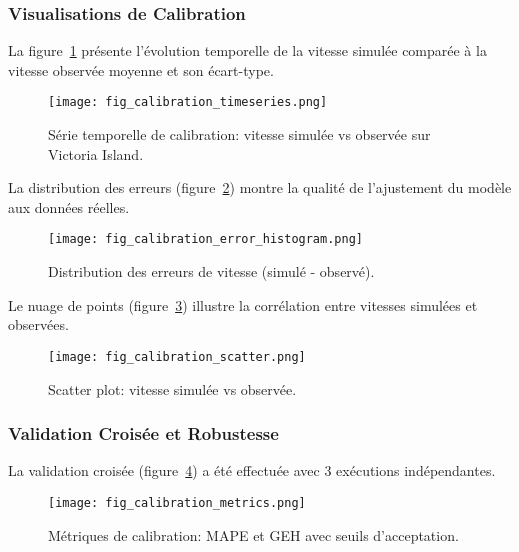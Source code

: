 \subsubsection{Visualisations de Calibration}

La figure~\ref{fig:calibration_timeseries_74} présente l'évolution temporelle de la vitesse 
simulée comparée à la vitesse observée moyenne et son écart-type.

\begin{figure}[htbp]
  \centering
  \texttt{[image: fig\_calibration\_timeseries.png]}
  \caption{Série temporelle de calibration: vitesse simulée vs observée sur Victoria Island.}
  \label{fig:calibration_timeseries_74}
\end{figure}

La distribution des erreurs (figure~\ref{fig:calibration_error_histogram_74}) montre 
la qualité de l'ajustement du modèle aux données réelles.

\begin{figure}[htbp]
  \centering
  \texttt{[image: fig\_calibration\_error\_histogram.png]}
  \caption{Distribution des erreurs de vitesse (simulé - observé).}
  \label{fig:calibration_error_histogram_74}
\end{figure}

Le nuage de points (figure~\ref{fig:calibration_scatter_74}) illustre la corrélation 
entre vitesses simulées et observées.

\begin{figure}[htbp]
  \centering
  \texttt{[image: fig\_calibration\_scatter.png]}
  \caption{Scatter plot: vitesse simulée vs observée.}
  \label{fig:calibration_scatter_74}
\end{figure}

\subsubsection{Validation Croisée et Robustesse}

La validation croisée (figure~\ref{fig:calibration_metrics_74}) a été effectuée 
avec 3 exécutions indépendantes.

\begin{figure}[htbp]
  \centering
  \texttt{[image: fig\_calibration\_metrics.png]}
  \caption{Métriques de calibration: MAPE et GEH avec seuils d'acceptation.}
  \label{fig:calibration_metrics_74}
\end{figure}


